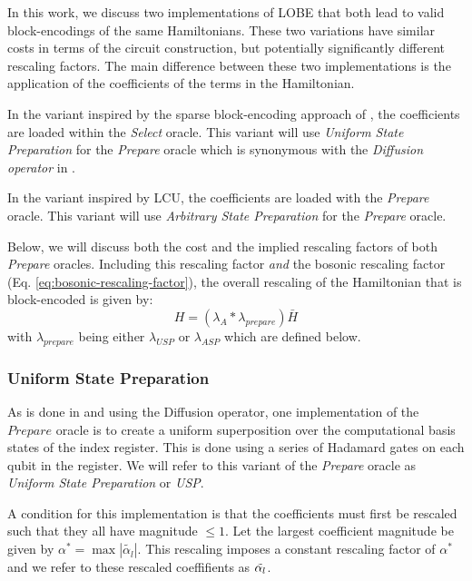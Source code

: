 In this work, we discuss two implementations of LOBE that both lead to valid block-encodings of the same Hamiltonians.
These two variations have similar costs in terms of the circuit construction, but potentially significantly different rescaling factors.
The main difference between these two implementations is the application of the coefficients of the terms in the Hamiltonian.

In the variant inspired by the sparse block-encoding approach of \cite{camps2024explicit, liu2024efficient}, the coefficients are loaded within the \textit{Select} oracle.
This variant will use \textit{Uniform State Preparation} for the \textit{Prepare} oracle which is synonymous with the \textit{Diffusion operator} in \cite{camps2024explicit, liu2024efficient}.

In the variant inspired by LCU, the coefficients are loaded with the \textit{Prepare} oracle.
This variant will use \textit{Arbitrary State Preparation} for the \textit{Prepare} oracle.

Below, we will discuss both the cost and the implied rescaling factors of both \textit{Prepare} oracles.
Including this rescaling factor \textit{and} the bosonic rescaling factor (Eq. \ref{eq:bosonic-rescaling-factor}), the overall rescaling of the Hamiltonian that is block-encoded is given by:
\begin{equation}
    \label{eq:post-process}
    H = (\lambda_A * \lambda_{prepare}) \bar{H}
\end{equation}
with $\lambda_{prepare}$ being either $\lambda_{USP}$ or $\lambda_{ASP}$ which are defined below.


\subsubsection{Uniform State Preparation}
\label{subsubsec:usp}

As is done in \cite{camps2024explicit} and \cite{liu2024efficient} using the Diffusion operator, one implementation of the $\textit{Prepare}$ oracle is to create a uniform superposition over the computational basis states of the index register.
This is done using a series of Hadamard gates on each qubit in the register.
We will refer to this variant of the \textit{Prepare} oracle as \textit{Uniform State Preparation} or \textit{USP}.

A condition for this implementation is that the coefficients must first be rescaled such that they all have magnitude $\leq 1$.
Let the largest coefficient magnitude be given by $\alpha^* = \max{|\tilde{\alpha_l}|}$.
This rescaling imposes a constant rescaling factor of $\alpha^*$ and we refer to these rescaled coeffifients as $\Tilde{\alpha_l}$.

